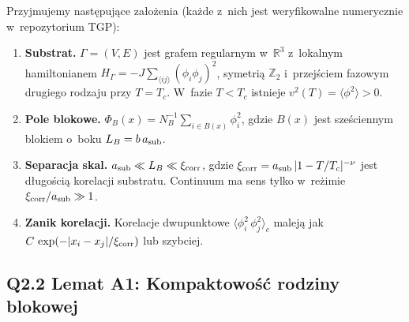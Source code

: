 Przyjmujemy nast\k{e}puj\k{a}ce za\l{}o\.zenia
(ka\.zde z~nich jest weryfikowalne numerycznie w~repozytorium TGP):

\begin{enumerate}[label=\textbf{(W\arabic*)},nosep]
  \item \label{W:substrate}
    \textbf{Substrat.}
    $\Gamma = (V,E)$ jest grafem regularnym w~$\mathbb{R}^3$ z~lokalnym
    hamiltonianem $H_\Gamma = -J\sum_{\langle ij\rangle}(\phi_i\phi_j)^2$,
    symetri\k{a} $\mathbb{Z}_2$ i~przej\'sciem fazowym drugiego rodzaju
    przy $T = T_c$.
    W~fazie $T < T_c$ istnieje $v^2(T) = \langle\phi^2\rangle > 0$.

  \item \label{W:block}
    \textbf{Pole blokowe.}
    $\Phi_B(x) = N_B^{-1}\sum_{i \in B(x)} \phi_i^2$,
    gdzie $B(x)$ jest sze\'sciennym blokiem o~boku $L_B = b\,a_{\rm sub}$.

  \item \label{W:separation}
    \textbf{Separacja skal.}
    $a_{\rm sub} \ll L_B \ll \xi_{\rm corr}$,
    gdzie $\xi_{\rm corr} = a_{\rm sub}\,|1 - T/T_c|^{-\nu}$
    jest d\l{}ugo\'sci\k{a} korelacji substratu.
    Continuum ma sens tylko w~re\.zimie $\xi_{\rm corr}/a_{\rm sub} \gg 1$.

  \item \label{W:correlation}
    \textbf{Zanik korelacji.}
    Korelacje dwupunktowe $\langle\phi_i^2\,\phi_j^2\rangle_c$
    malej\k{a} jak $C\,\exp(-|x_i - x_j|/\xi_{\rm corr})$
    lub szybciej.
\end{enumerate}

\subsection*{Q2.2 Lemat A1: Kompaktowo\'s\'c rodziny blokowej}
\label{ssec:lemma-A1}

